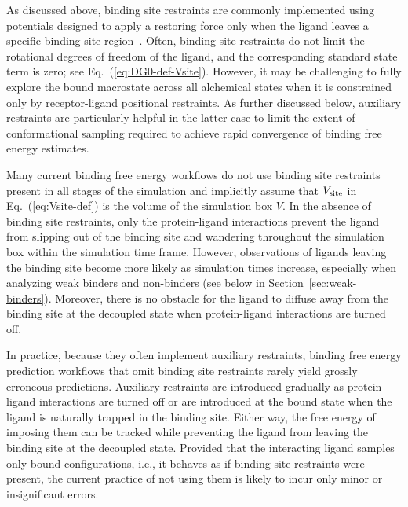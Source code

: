 \documentclass[9pt,bestpractices]{livecoms}
\begin{document}
As discussed above, binding site restraints are commonly implemented using potentials designed to apply a restoring force only when the ligand leaves a specific binding site region~\cite{chen2007can}. Often, binding site restraints do not limit the rotational degrees of freedom of the ligand, and the corresponding standard state term is zero; see Eq.~(\ref{eq:DG0-def-Vsite}). However, it may be challenging to fully explore the bound macrostate across all alchemical states when it is constrained only by receptor-ligand positional restraints. As further discussed below, auxiliary restraints are particularly helpful in the latter case to limit the extent of conformational sampling required to achieve rapid convergence of binding free energy estimates.

Many current binding free energy workflows do not use binding site restraints present in all stages of the simulation and implicitly assume that $V_{\rm site}$ in Eq.~(\ref{eq:Vsite-def}) is the volume of the simulation box $V$. In the absence of binding site restraints, only the protein-ligand interactions prevent the ligand from slipping out of the binding site and wandering throughout the simulation box within the simulation time frame. However, observations of ligands leaving the binding site become more likely as simulation times increase, especially when analyzing weak binders and non-binders (see below in Section~\ref{sec:weak-binders}). Moreover, there is no obstacle for the ligand to diffuse away from the binding site at the decoupled state when protein-ligand interactions are turned off.

In practice, because they often implement auxiliary restraints, binding free energy prediction workflows that omit binding site restraints rarely yield grossly erroneous predictions. Auxiliary restraints are introduced gradually as protein-ligand interactions are turned off or are introduced at the bound state when the ligand is naturally trapped in the binding site. Either way, the free energy of imposing them can be tracked while preventing the ligand from leaving the binding site at the decoupled state. Provided that the interacting ligand samples only bound configurations, i.e., it behaves as if binding site restraints were present, the current practice of not using them is likely to incur only minor or insignificant errors. 
\end{document}
